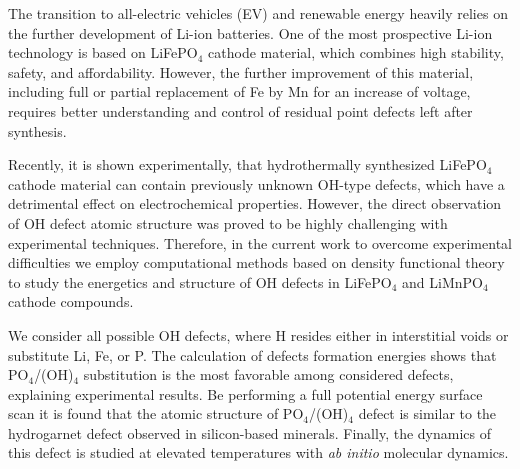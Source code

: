
The transition to all-electric vehicles (EV) and renewable energy heavily relies on the further development of Li-ion batteries. One of the most prospective Li-ion technology is based on LiFePO$_4$ cathode material,  which combines high stability, safety, and affordability. However, the further improvement of this material, including full or partial replacement of Fe by Mn for an increase of voltage, requires better understanding and control of residual point defects left after synthesis. 

Recently, it is shown experimentally, that hydrothermally synthesized LiFePO$_4$ cathode material can contain previously unknown OH-type defects, which have a detrimental effect on electrochemical properties. However, the direct observation of OH defect atomic structure was proved to be highly challenging with experimental techniques. Therefore, in the current work to overcome experimental difficulties we employ computational methods based on density functional theory to study the energetics and structure of OH defects in LiFePO$_4$ and LiMnPO$_4$ cathode compounds.

We consider all possible OH defects, where H resides either in interstitial voids or substitute Li, Fe, or P. The calculation of defects formation energies shows that PO$_4$/(OH)$_4$ substitution is the most favorable among considered defects, explaining experimental results. Be performing a full potential energy surface scan it is found that the atomic structure of PO$_4$/(OH)$_4$ defect is similar to the hydrogarnet defect observed in silicon-based minerals. Finally, the dynamics of this defect is studied at elevated temperatures with \textit{ab initio} molecular dynamics. 









